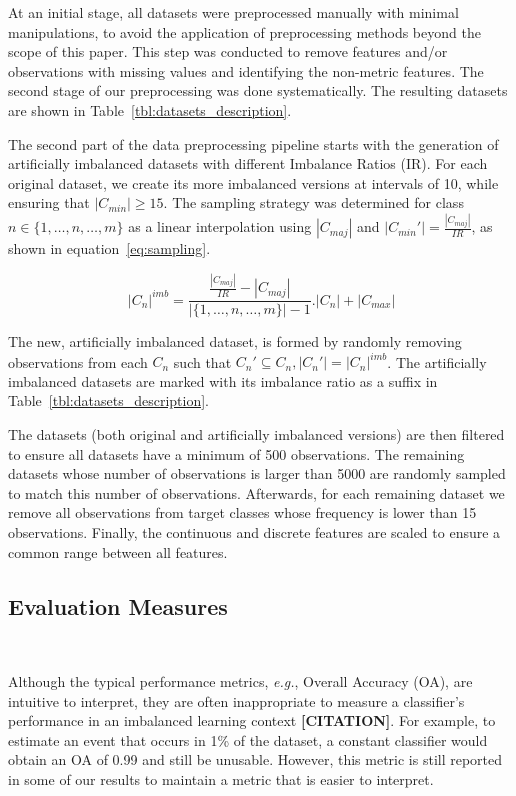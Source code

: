 \documentclass[parskip=full]{scrartcl}
\begin{document}
At an initial stage, all datasets were preprocessed manually with minimal
manipulations, to avoid the application of preprocessing methods beyond the
scope of this paper. This step was conducted to remove features and/or
observations with missing values and identifying the non-metric features. The
second stage of our preprocessing was done systematically. The resulting
datasets are shown in Table~\ref{tbl:datasets_description}.



The second part of the data preprocessing pipeline starts with the generation
of artificially imbalanced datasets with different Imbalance Ratios (IR). For
each original dataset, we create its more imbalanced versions at intervals of
10, while ensuring that $|C_{min}| \ge 15$. The sampling strategy was
determined for class $n \in \{1,\ldots,n,\ldots,m\}$ as a linear interpolation using $|C_{maj}|$ and
$|C_{min}'|=\frac{|C_{maj}|}{IR}$, as shown in equation~\ref{eq:sampling}.

\begin{equation}~\label{eq:sampling}
    |C_n|^{imb} =
    \frac{\frac{|C_{maj}|}{IR}-|C_{maj}|}{|\{1,\ldots,n,\ldots,m\}|-1}.|C_n|+|C_{max}|
\end{equation}

The new, artificially imbalanced dataset, is formed by randomly removing
observations from each $C_n$ such that $C_n' \subseteq C_n , |C_n'| =
|C_n|^{imb}$. The artificially imbalanced datasets are marked with its
imbalance ratio as a suffix in Table~\ref{tbl:datasets_description}.

The datasets (both original and artificially imbalanced versions) are then
filtered to ensure all datasets have a minimum of 500 observations.  The
remaining datasets whose number of observations is larger than 5000 are
randomly sampled to match this number of observations. Afterwards, for each
remaining dataset we remove all observations from target classes whose
frequency is lower than 15 observations. Finally, the continuous and discrete
features are scaled to ensure a common range between all features. 

\subsection{Evaluation Measures}~\label{sec:evaluation_measures}

Although the typical performance metrics, \textit{e.g.}, Overall Accuracy
(OA), are intuitive to interpret, they are often inappropriate to measure a
classifier's performance in an imbalanced learning context
\textbf{[CITATION]}. For example, to estimate an event that occurs in 1\% of
the dataset, a constant classifier would obtain an OA of 0.99 and still be
unusable. However, this metric is still reported in some of our results to
maintain a metric that is easier to interpret.
\end{document}
